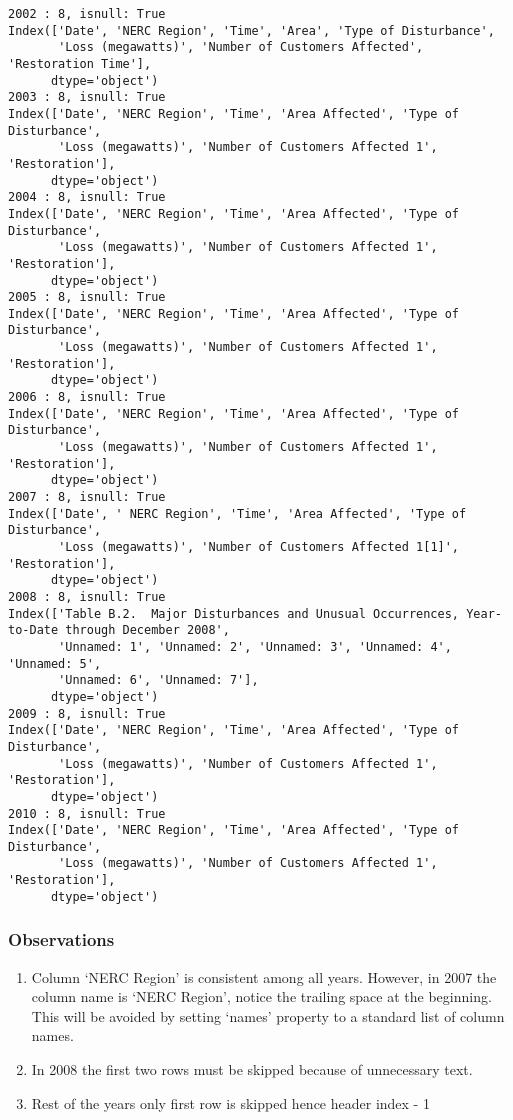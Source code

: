 \documentclass[11pt]{article}
\providecommand{\tightlist}{%
      \setlength{\itemsep}{0pt}\setlength{\parskip}{0pt}}
\begin{document}
    \begin{Verbatim}[commandchars=\\\{\}]
2002 : 8, isnull: True
Index(['Date', 'NERC Region', 'Time', 'Area', 'Type of Disturbance',
       'Loss (megawatts)', 'Number of Customers Affected', 'Restoration Time'],
      dtype='object')
2003 : 8, isnull: True
Index(['Date', 'NERC Region', 'Time', 'Area Affected', 'Type of Disturbance',
       'Loss (megawatts)', 'Number of Customers Affected 1', 'Restoration'],
      dtype='object')
2004 : 8, isnull: True
Index(['Date', 'NERC Region', 'Time', 'Area Affected', 'Type of Disturbance',
       'Loss (megawatts)', 'Number of Customers Affected 1', 'Restoration'],
      dtype='object')
2005 : 8, isnull: True
Index(['Date', 'NERC Region', 'Time', 'Area Affected', 'Type of Disturbance',
       'Loss (megawatts)', 'Number of Customers Affected 1', 'Restoration'],
      dtype='object')
2006 : 8, isnull: True
Index(['Date', 'NERC Region', 'Time', 'Area Affected', 'Type of Disturbance',
       'Loss (megawatts)', 'Number of Customers Affected 1', 'Restoration'],
      dtype='object')
2007 : 8, isnull: True
Index(['Date', ' NERC Region', 'Time', 'Area Affected', 'Type of Disturbance',
       'Loss (megawatts)', 'Number of Customers Affected 1[1]', 'Restoration'],
      dtype='object')
2008 : 8, isnull: True
Index(['Table B.2.  Major Disturbances and Unusual Occurrences, Year-to-Date through December 2008',
       'Unnamed: 1', 'Unnamed: 2', 'Unnamed: 3', 'Unnamed: 4', 'Unnamed: 5',
       'Unnamed: 6', 'Unnamed: 7'],
      dtype='object')
2009 : 8, isnull: True
Index(['Date', 'NERC Region', 'Time', 'Area Affected', 'Type of Disturbance',
       'Loss (megawatts)', 'Number of Customers Affected 1', 'Restoration'],
      dtype='object')
2010 : 8, isnull: True
Index(['Date', 'NERC Region', 'Time', 'Area Affected', 'Type of Disturbance',
       'Loss (megawatts)', 'Number of Customers Affected 1', 'Restoration'],
      dtype='object')

    \end{Verbatim}

    \subsubsection{Observations}\label{observations}

\begin{enumerate}
\def\labelenumi{\arabic{enumi}.}
\tightlist
\item
  Column `NERC Region' is consistent among all years. However, in 2007
  the column name is `NERC Region', notice the trailing space at the
  beginning. This will be avoided by setting `names' property to a
  standard list of column names.
\item
  In 2008 the first two rows must be skipped because of unnecessary
  text.
\item
  Rest of the years only first row is skipped hence header index - 1
\end{enumerate}
\end{document}

